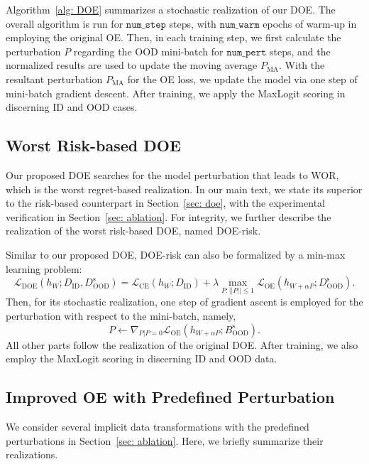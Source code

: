\documentclass{article} \usepackage{iclr2022_conference,times}
\begin{document}
Algorithm~\ref{alg: DOE} summarizes a stochastic realization of our DOE. The overall algorithm is run for $\texttt{num\_step}$ steps, with $\texttt{num\_warm}$ epochs of warm-up in employing the original OE. Then, in each training step, we first calculate the perturbation $P$ regarding the OOD mini-batch for $\texttt{num\_pert}$ steps, and the normalized results are used to update the moving average $P_\text{MA}$. With the resultant perturbation $P_\text{MA}$ for the OE loss, we update the model via one step of mini-batch gradient descent. After training, we apply the MaxLogit scoring in discerning ID and OOD cases. 


\subsection{Worst Risk-based DOE}


Our proposed DOE searches for the model perturbation that leads to WOR, which is the worst regret-based realization. In our main text, we state its superior to the risk-based counterpart in Section~\ref{sec: doe}, with the experimental verification in Section~\ref{sec: ablation}. For integrity,  we further describe the realization of the worst risk-based DOE, named DOE-risk. 


Similar to our proposed DOE, DOE-risk can also be formalized by a min-max learning problem:
\begin{equation}
    \mathcal{L}_\text{DOE}(h_{W}; D_\text{ID}, D^\text{s}_\text{OOD})= {\mathcal{L}}_\text{CE} (h_W;   D_\text{ID}) +\lambda\max_{P: \lvert\lvert P\rvert\rvert \le 1} \mathcal{L}_\text{OE}(h_{W+ \alpha P}; D^\text{s}_\text{OOD}). 
\end{equation}
Then, for its stochastic realization, one step of gradient ascent is employed for the perturbation with respect to the mini-batch, namely,
\begin{equation}
    {P} \leftarrow \nabla_{P|P=0} \mathcal{L}_\text{OE} (h_{W+ \alpha P}; B^\text{s}_\text{OOD}). \label{eq: pert_cal}
\end{equation}
All other parts follow the realization of the original DOE. After training, we also employ the MaxLogit scoring in discerning ID and OOD data. 

\subsection{Improved OE with Predefined Perturbation}

We consider several implicit data transformations with the predefined perturbations in Section~\ref{sec: ablation}. Here, we briefly summarize their realizations.
\end{document}
